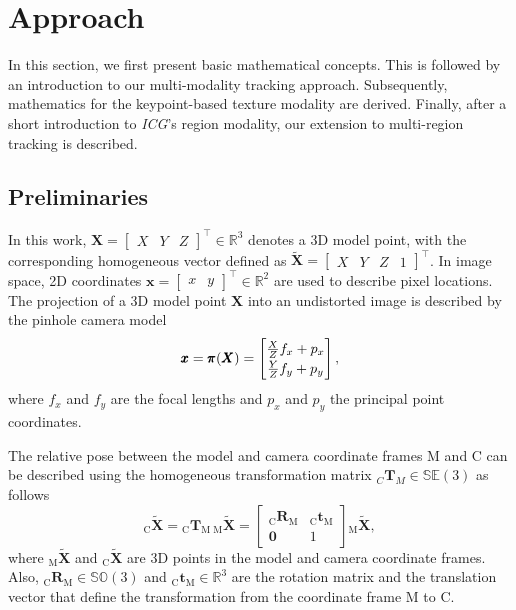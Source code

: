 \documentclass[letterpaper, 10 pt, conference]{ieeeconf}
\begin{document}
\section{Approach}\label{sec:c}
In this section, we first present basic mathematical concepts.
This is followed by an introduction to our multi-modality tracking approach.
Subsequently, mathematics for the keypoint-based texture modality are derived.
Finally, after a short introduction to \textit{ICG}'s region modality, our extension to multi-region tracking is described.



\subsection{Preliminaries}\label{sec:c0}
In this work, $\pmb{X} = \begin{bmatrix} X& Y& Z\end{bmatrix}^\top\in \mathbb{R}^3$ denotes a 3D model point, with the corresponding homogeneous vector defined as $\pmb{\widetilde{X}} = \begin{bmatrix} X& Y& Z& 1\end{bmatrix}^\top$.
In image space, 2D coordinates $\pmb{x} = \begin{bmatrix} x& y\end{bmatrix}^\top \in \mathbb{R}^2$ are used to describe pixel locations.
The projection of a 3D model point $\pmb{X}$ into an undistorted image is described by the pinhole camera model
\begin{equation}\label{eq:c01}
	\renewcommand\arraystretch{1.2}
	\pmb{x} = \pmb{\pi}(\pmb{X}) = 
	\begin{bmatrix}
		\frac{X}{Z}f_x + p_x\\
		\frac{Y}{Z}f_y + p_y
	\end{bmatrix},
\end{equation}
where $f_x$ and $f_y$ are the focal lengths and $p_x$ and $p_y$ the principal point coordinates.

The relative pose between the model and camera coordinate frames $\textrm{M}$ and $\textrm{C}$ can be described using the homogeneous transformation matrix ${}_C\pmb{T}_M{}\in \mathbb{SE}(3)$ as follows
\begin{equation}\label{eq:c03}
	_\textrm{C}\pmb{\widetilde{X}} = {}_\textrm{C}\pmb{T}_\textrm{M}\,{}_\textrm{M}\pmb{\widetilde{X}} =
	\begin{bmatrix}
		_\textrm{C}\pmb{R}_\textrm{M} & _\textrm{C}\pmb{t}_\textrm{M} \\ \pmb{0} & 1
	\end{bmatrix}
	{}_\textrm{M}\pmb{\widetilde{X}},
\end{equation}
where ${}_\textrm{M}\pmb{\widetilde{X}}$ and $_\textrm{C}\pmb{\widetilde{X}}$ are 3D points in the model and camera coordinate frames.
Also, $_\textrm{C}\pmb{R}_\textrm{M} \in \mathbb{SO}(3)$ and $_\textrm{C}\pmb{t}_\textrm{M} \in \mathbb{R}^3$ are the rotation matrix and the translation vector that define the transformation from the coordinate frame $\textrm{M}$ to $\textrm{C}$.
\end{document}
